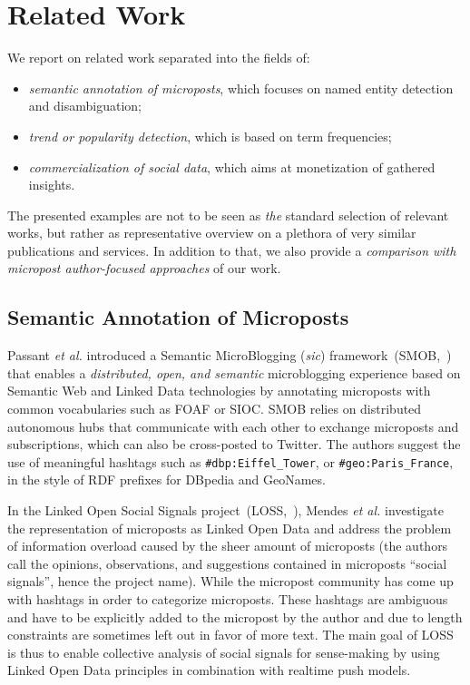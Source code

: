 \documentclass{iosart2c}
\begin{document}



\section{Related Work} \label{sec:relatedwork}
We report on related work separated into the fields of:
\begin{itemize}
\item \emph{semantic annotation of microposts}, which focuses on named entity detection and disambiguation;
\item \emph{trend or popularity detection}, which is based on term frequencies;
\item \emph{commercialization of social data}, which aims at monetization of gathered insights.
\end{itemize}
The presented examples are not to be seen as \emph{the} standard selection of relevant works, but rather as representative overview on a plethora of very similar publications and services.
In addition to that, we also provide a \emph{comparison with micropost author-focused approaches} of our work.

\subsection{Semantic Annotation of Microposts}
Passant \textit{et al.} introduced a Semantic MicroBlogging (\textit{sic}) framework~(SMOB,~\cite{Passant2008}) that enables a \textit{distributed, open, and semantic} microblogging experience based on Semantic Web and Linked Data technologies by annotating microposts with common vocabularies such as FOAF or SIOC.
SMOB relies on distributed autonomous hubs that communicate with each other to exchange microposts and subscriptions, which can also be cross-posted to Twitter.
The authors suggest the use of meaningful hashtags such as \texttt{\#dbp:Eiffel\_Tower}, or \texttt{\#geo:Paris\_France}, in the style of RDF prefixes for DBpedia and GeoNames.

In the Linked Open Social Signals project~(LOSS,~\cite{Mendes:LOSS}), Mendes \textit{et al.} investigate the representation of microposts as Linked Open Data and address the problem of information overload caused by the sheer amount of microposts (the authors call the opinions, observations, and suggestions contained in microposts ``social signals'', hence the project name).
While the micropost community has come up with hashtags in order to categorize microposts.
These hashtags are ambiguous and have to be explicitly added to the micropost by the author and due to length constraints are sometimes left out in favor of more text.
The main goal of LOSS is thus to enable collective analysis of social signals for sense-making by using Linked Open Data principles in combination with realtime push models.
\end{document}
